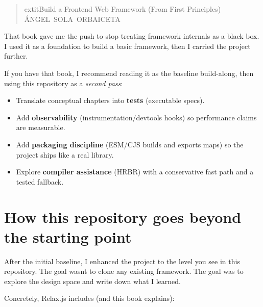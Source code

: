 \begin{quote}
	extit{Build a Frontend Web Framework (From First Principles)}\\
\textsc{\mbox{\hspace{0.2em}ÁNGEL SOLA ORBAICETA}}
\end{quote}

That book gave me the push to stop treating framework internals as a black box.
I used it as a foundation to build a basic framework, then I carried the project further.

If you have that book, I recommend reading it as the baseline build-along, then using this repository as a \emph{second pass}:

\begin{itemize}
  \item Translate conceptual chapters into \textbf{tests} (executable specs).
  \item Add \textbf{observability} (instrumentation/devtools hooks) so performance claims are measurable.
  \item Add \textbf{packaging discipline} (ESM/CJS builds and exports maps) so the project ships like a real library.
  \item Explore \textbf{compiler assistance} (HRBR) with a conservative fast path and a tested fallback.
\end{itemize}

\section*{How this repository goes beyond the starting point}

After the initial baseline, I enhanced the project to the level you see in this repository.
The goal wasn\textquotesingle t to clone any existing framework.
The goal was to explore the design space and write down what I learned.

Concretely, Relax.js includes (and this book explains):

